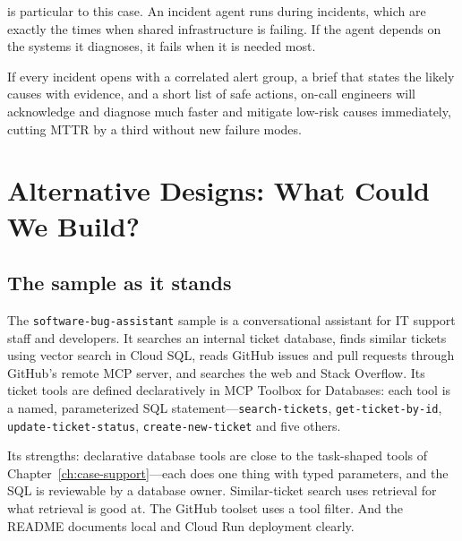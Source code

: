 \begin{watchout}
 is particular to this case. An incident agent runs during incidents, which are exactly the times when shared infrastructure is failing. If the agent depends on the systems it diagnoses, it fails when it is needed most.
\end{watchout}

\begin{keyidea}
If every incident opens with a correlated alert group, a brief that states the likely causes with evidence, and a short list of safe actions, on-call engineers will acknowledge and diagnose much faster and mitigate low-risk causes immediately, cutting MTTR by a third without new failure modes.
\end{keyidea}

\section{Alternative Designs: What Could We Build?}
\label{sec:inc-designs}

\subsection{The sample as it stands}

The \texttt{software-bug-assistant} sample is a conversational assistant for IT support staff and developers. It searches an internal ticket database, finds similar tickets using vector search in Cloud SQL, reads GitHub issues and pull requests through GitHub's remote MCP server, and searches the web and Stack Overflow. Its ticket tools are defined declaratively in MCP Toolbox for Databases: each tool is a named, parameterized SQL statement---\texttt{search-tickets}, \texttt{get-ticket-by-id}, \texttt{update-ticket-status}, \texttt{create-new-ticket} and five others.

Its strengths: declarative database tools are close to the task-shaped tools of Chapter~\ref{ch:case-support}---each does one thing with typed parameters, and the SQL is reviewable by a database owner. Similar-ticket search uses retrieval for what retrieval is good at. The GitHub toolset uses a tool filter. And the README documents local and Cloud Run deployment clearly.

